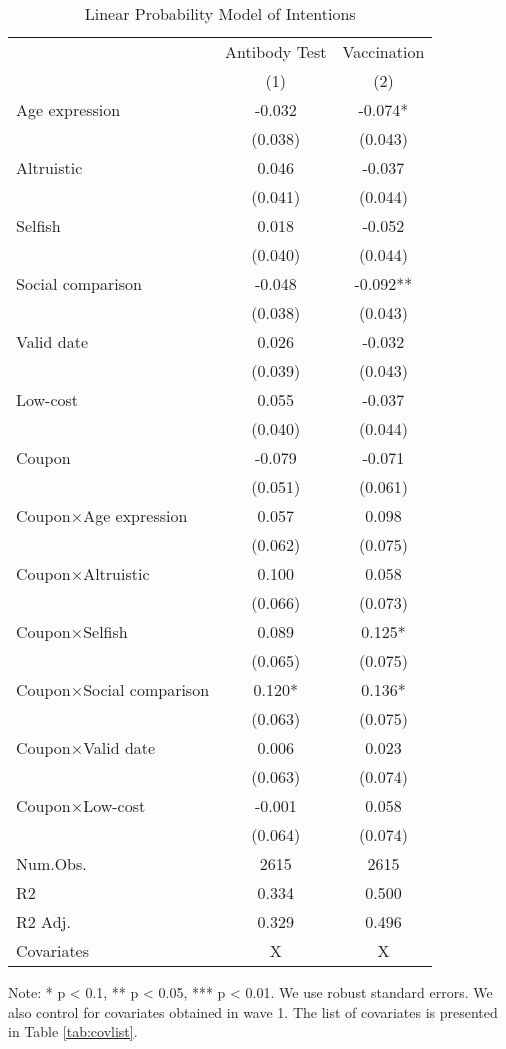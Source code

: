 \documentclass[
  11pt,
  a4paper,
]{article}
\begin{document}
\begin{table}

\caption{\label{tab:int-reg}Linear Probability Model of Intentions}
\centering
\begin{threeparttable}
\begin{tabular}[t]{lcc}
\toprule
\multicolumn{1}{c}{ } & \multicolumn{1}{c}{Antibody Test} & \multicolumn{1}{c}{Vaccination} \\
\cmidrule(l{3pt}r{3pt}){2-2} \cmidrule(l{3pt}r{3pt}){3-3}
  & (1) & (2)\\
\midrule
Age expression & -0.032 & -0.074*\\
 & (0.038) & \vphantom{1} (0.043)\\
Altruistic & 0.046 & -0.037\\
 & (0.041) & (0.044)\\
Selfish & 0.018 & -0.052\\
 & (0.040) & \vphantom{1} (0.044)\\
Social comparison & -0.048 & -0.092**\\
 & (0.038) & (0.043)\\
Valid date & 0.026 & -0.032\\
 & (0.039) & (0.043)\\
Low-cost & 0.055 & -0.037\\
 & (0.040) & (0.044)\\
Coupon & -0.079 & -0.071\\
 & (0.051) & (0.061)\\
Coupon×Age expression & 0.057 & 0.098\\
 & (0.062) & (0.075)\\
Coupon×Altruistic & 0.100 & 0.058\\
 & (0.066) & (0.073)\\
Coupon×Selfish & 0.089 & 0.125*\\
 & (0.065) & (0.075)\\
Coupon×Social comparison & 0.120* & 0.136*\\
 & (0.063) & (0.075)\\
Coupon×Valid date & 0.006 & 0.023\\
 & (0.063) & (0.074)\\
Coupon×Low-cost & -0.001 & 0.058\\
 & (0.064) & (0.074)\\
\midrule
Num.Obs. & 2615 & 2615\\
R2 & 0.334 & 0.500\\
R2 Adj. & 0.329 & 0.496\\
Covariates & X & X\\
\bottomrule
\end{tabular}
\begin{tablenotes}
\item Note: * p < 0.1, ** p < 0.05, *** p < 0.01. We use robust standard errors. We also control for covariates obtained in wave 1. The list of covariates is presented in Table \ref{tab:covlist}.
\end{tablenotes}
\end{threeparttable}
\end{table}
\end{document}
